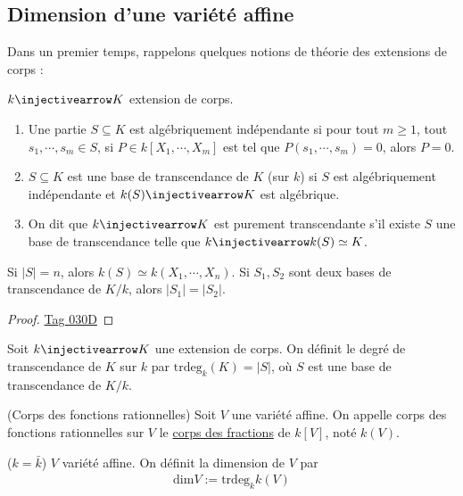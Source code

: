         \subsection{Dimension d'une variété affine}
            Dans un premier temps, rappelons quelques notions de théorie des extensions de corps :
            \begin{defi}
                $k \injectivearrow K$ extension de corps.
                \begin{enumerate}
                    \item Une partie $S \subseteq K$ est algébriquement indépendante si pour tout $m \geq 1$, tout $s_1, \cdots, s_m \in S$, si $P \in k[X_1, \cdots, X_m]$ est tel que $P(s_1, \cdots, s_m) = 0$, alors $P = 0$.
                    \item $S \subseteq K$ est une base de transcendance de $K$ (sur $k$) si $S$ est algébriquement indépendante et $k(S) \injectivearrow K$ est algébrique.
                    \item On dit que $k \injectivearrow K$ est purement transcendante s'il existe $S$ une base de transcendance telle que $k \injectivearrow k(S) \simeq K$.
                \end{enumerate}
            \end{defi}
            \begin{prop}
                Si $|S| = n$, alors $k(S) \simeq k(X_1, \cdots, X_n)$. Si $S_1,S_2$ sont deux bases de transcendance de $K/k$, alors $|S_1| = |S_2|$. 
            \end{prop}
            \begin{proof}
                \href{https://stacks.math.columbia.edu/tag/030D}{Tag 030D}
            \end{proof}
            \begin{defi}
                Soit $k \injectivearrow K$ une extension de corps. On définit le degré de transcendance de $K$ sur $k$ par $\mathrm{trdeg}_k(K) = |S|$, où $S$ est une base de transcendance de $K/k$.
            \end{defi}
            \begin{defi} (Corps des fonctions rationnelles)
                Soit $V$ une variété affine. On appelle corps des fonctions rationnelles sur $V$ le \hyperref[Frac]{corps des fractions} de $k[V]$, noté $k(V)$. 
            \end{defi}
            \begin{defi} ($k = \bar k$)
                $V$ variété affine. On définit la dimension de $V$ par
                \begin{align*}
                    \mathrm{dim} V := \mathrm{trdeg}_k k(V)
                \end{align*}
            \end{defi}
